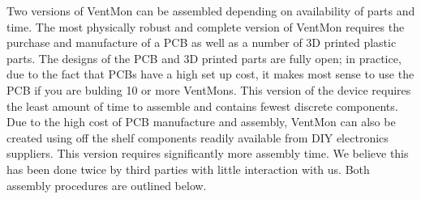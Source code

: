 \documentclass[11pt, letterpaper]{article}
\begin{document}
Two versions of VentMon can be assembled depending on availability of parts and time. The most physically robust and complete version of VentMon requires the purchase and manufacture of a PCB as well as a number of 3D printed plastic parts. The designs of the PCB and 3D printed parts are fully open; in practice, due to the fact that PCBs have a high set up cost, it makes most sense to use the PCB if you are bulding 10 or more VentMons. This version of the device requires the least amount of time to assemble and contains fewest discrete components. Due to the high cost of PCB manufacture and assembly, VentMon can also be created using off the shelf components readily available from DIY electronics suppliers. This version requires significantly more assembly time. We believe this has been done twice by third parties with little interaction with us. Both assembly procedures are outlined below.
\end{document}
